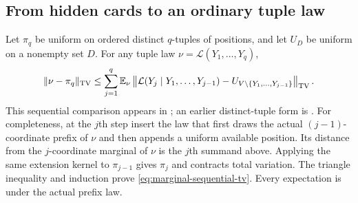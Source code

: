 \subsection{From hidden cards to an ordinary tuple law}

Let $\pi_q$ be uniform on ordered distinct $q$-tuples of positions,
and let $U_D$ be uniform on a nonempty set $D$. For any tuple law
$\nu=\mathcal L(Y_1,\ldots,Y_q)$,
\begin{equation}\label{eq:marginal-sequential-tv}
 \|\nu-\pi_q\|_{\mathrm{TV}}
 \le\sum_{j=1}^q\mathbb E_\nu
 \left\|
 \mathcal L(Y_j\mid Y_1,\ldots,Y_{j-1})
 -U_{V\setminus\{Y_1,\ldots,Y_{j-1}\}}
 \right\|_{\mathrm{TV}}.
\end{equation}
This sequential comparison appears in
\cite[Appendix~A, Lemma~2]{mrs}; an earlier distinct-tuple form is
\cite[Section~5.3, Lemma~12]{morris-exclusion2006}.
For completeness, at the $j$th step insert the law that first
draws the actual $(j-1)$-coordinate prefix of $\nu$ and then
appends a uniform available position. Its distance from the
$j$-coordinate marginal of $\nu$ is the $j$th summand above.
Applying the same extension kernel to $\pi_{j-1}$ gives $\pi_j$
and contracts total variation. The triangle inequality and
induction prove \eqref{eq:marginal-sequential-tv}. Every
expectation is under the actual prefix law.

